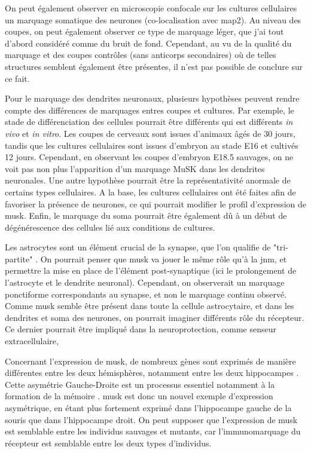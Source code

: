 On peut également observer en microscopie confocale sur les cultures cellulaires un marquage somatique des neurones (co-localisation avec \gls{map2}). Au niveau des coupes, on peut également observer ce type de marquage léger, que j'ai tout d'abord considéré comme du bruit de fond. Cependant, au vu de la qualité du marquage et des coupes contrôles (sans anticorps secondaires) où de telles structures semblent également être présentes, il n'est pas possible de conclure sur ce fait.

Pour le marquage des dendrites neuronaux, plusieurs hypothèses peuvent rendre compte des différences de marquages entres coupes et cultures. Par exemple, le stade de différenciation des cellules pourrait être différents qui est différents \emph{in vivo} et \emph{in vitro}. Les coupes de cerveaux sont issues d'animaux âgés de 30 jours, tandis que les cultures cellulaires sont issues d'embryon au stade E16 et cultivés 12 jours. Cependant, en observant les coupes d’embryon E18.5 sauvages, on ne voit pas non plus l’apparition d’un marquage MuSK dans les dendrites neuronales. Une autre hypothèse pourrait être la représentativité anormale de certains types cellulaires. A la base, les cultures cellulaires ont été faites afin de favoriser la présence de neurones, ce qui pourrait modifier le profil d'expression de \gls{musk}. Enfin, le marquage du soma pourrait être également dû à un début de dégénérescence des cellules lié aux conditions de cultures.

Les astrocytes sont un élément crucial de la synapse, que l'on qualifie de "tri-partite" \cite{Araque1999, Perea2009}. On pourrait penser que \gls{musk} va jouer le même rôle qu'à la \gls{jnm}, et permettre la mise en place de l'élément post-synaptique (ici le prolongement de l'astrocyte et le dendrite neuronal). Cependant, on observerait un marquage ponctiforme correspondants au synapse, et non le marquage continu observé. Comme \gls{musk} semble être présent dans toute la cellule astrocytaire, et dans les dendrites et soma des neurones, on pourrait imaginer différents rôle du récepteur. Ce dernier pourrait être impliqué dans la neuroprotection, comme senseur extracellulaire, 

Concernant l'expression de \gls{musk}, de nombreux gènes sont exprimés de manière différentes entre les deux hémisphères, notamment entre les deux hippocampes \cite{Moskal2006}. Cette asymétrie Gauche-Droite est un processus essentiel notamment à la formation de la mémoire \cite{Shimbo2018}. \gls{musk} est donc un nouvel exemple d'expression asymétrique, en étant plus fortement exprimé dans l'hippocampe gauche de la souris que dans l'hippocampe droit. On peut supposer que l'expression de \gls{musk} est semblable entre les individus sauvages et mutants, car l'immunomarquage du récepteur est semblable entre les deux types d'individus.

